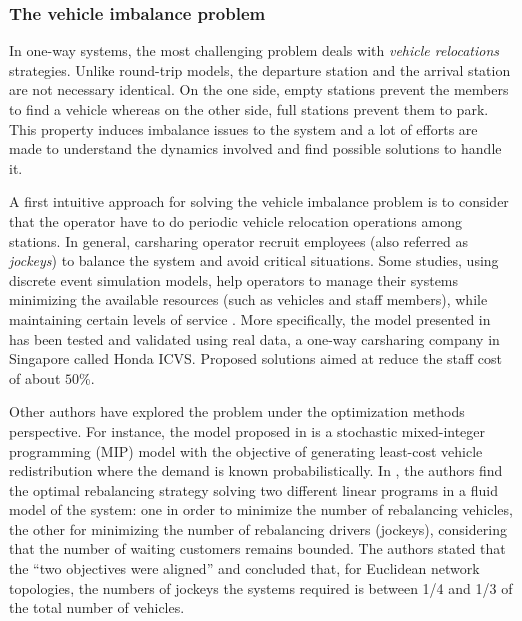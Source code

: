 \begin{bibunit}[ieeetr]
\subsubsection{The vehicle imbalance problem}
In one-way systems, the most challenging problem deals with \emph{vehicle relocations} strategies.
Unlike round-trip models, the departure station and the arrival station are not necessary identical.
On the one side, empty stations prevent the members to find a vehicle whereas on the other side, full stations prevent them to park.
This property induces imbalance issues to the system and a lot of efforts are made to understand the dynamics involved and find possible solutions to handle it.

\medskip
A first intuitive approach for solving the vehicle imbalance problem is to consider that the operator have to do periodic vehicle relocation operations among stations.
In general, carsharing operator recruit employees (also referred as \emph{jockeys}) to balance the system and avoid critical situations.
Some studies, using discrete event simulation models, help operators to manage their systems minimizing the available resources (such as vehicles and staff members), while maintaining certain levels of service \cite{barth_simulation_1999, kek_relocation_2006, kek_decision_2009}.
More specifically, the model presented in \cite{kek_decision_2009} has been tested and validated using real data, a one-way carsharing company in Singapore called Honda ICVS.
Proposed solutions aimed at reduce the staff cost of about $50$\%.

\medskip
Other authors have explored the problem under the optimization methods perspective.
For instance, the model proposed in \cite{nair_fleet_2011} is a stochastic mixed-integer programming (MIP) model with the objective of generating least-cost vehicle redistribution where the demand is known probabilistically.
In \cite{smith_rebalancing_2013}, the authors find the optimal rebalancing strategy solving two different linear programs in a fluid model of the system: one in order to minimize the number of rebalancing vehicles, the other for minimizing the number of rebalancing drivers (jockeys), considering that the number of waiting customers remains bounded.
The authors stated that the ``two objectives were aligned'' and concluded that, for Euclidean network topologies, the numbers of jockeys the systems required is between 1/4 and 1/3 of the total number of vehicles.


\end{bibunit}
